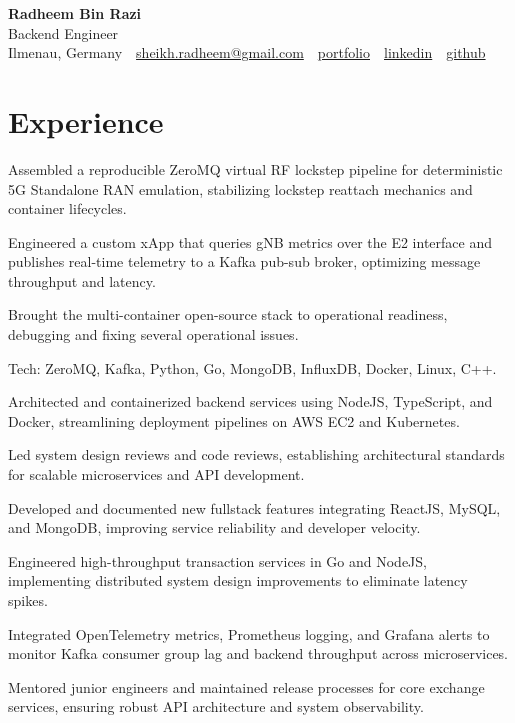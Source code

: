 \documentclass[10pt,a4paper]{resume}
\makeatletter
\newcommand{\Portfolio}{https://radheem.github.io/my-cv}
\newcommand{\PortfolioText}{portfolio}
\newcommand{\GitHub}{https://github.com/radheem}
\newcommand{\LinkedIn}{https://www.linkedin.com/in/radheem-razi}
\newcommand{\Email}{sheikh.radheem@gmail.com}
\makeatother
\begin{document}
\begin{center}
  {\huge\bfseries Radheem Bin Razi}\\[3pt]
  {\large Backend Engineer}\\[6pt]
  \small
  Ilmenau, Germany \,\textbar\,
  \href{mailto:\Email}{\Email} \,\textbar\,
  \href{\Portfolio}{\PortfolioText} \,\textbar\,
  \href{\LinkedIn}{linkedin} \,\textbar\,
  \href{\GitHub}{github}
\end{center}
\vspace{2pt}

\section{Experience}

\bullets
  \item Assembled a reproducible ZeroMQ virtual RF lockstep pipeline for deterministic 5G Standalone RAN emulation, stabilizing lockstep reattach mechanics and container lifecycles.
  \item Engineered a custom xApp that queries gNB metrics over the E2 interface and publishes real-time telemetry to a Kafka pub-sub broker, optimizing message throughput and latency.
  \item Brought the multi-container open-source stack to operational readiness, debugging and fixing several operational issues.
  \item Tech: ZeroMQ, Kafka, Python, Go, MongoDB, InfluxDB, Docker, Linux, C++.
\bulletsend
\vspace{1.5pt}
\bullets
  \item Architected and containerized backend services using NodeJS, TypeScript, and Docker, streamlining deployment pipelines on AWS EC2 and Kubernetes.
  \item Led system design reviews and code reviews, establishing architectural standards for scalable microservices and API development.
  \item Developed and documented new fullstack features integrating ReactJS, MySQL, and MongoDB, improving service reliability and developer velocity.
\bulletsend
\vspace{1.5pt}
\bullets
  \item Engineered high-throughput transaction services in Go and NodeJS, implementing distributed system design improvements to eliminate latency spikes.
  \item Integrated OpenTelemetry metrics, Prometheus logging, and Grafana alerts to monitor Kafka consumer group lag and backend throughput across microservices.
  \item Mentored junior engineers and maintained release processes for core exchange services, ensuring robust API architecture and system observability.
\bulletsend
\vspace{1.5pt}
\end{document}
